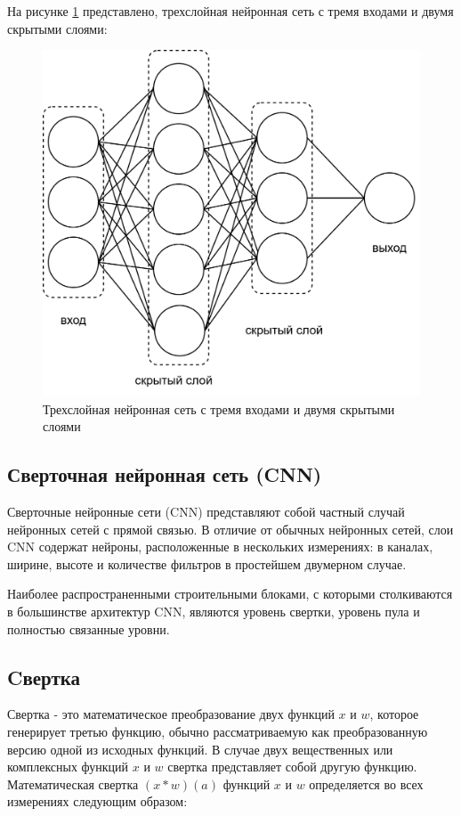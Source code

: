 На рисунке \ref{fig:neuron-arch} представлено, трехслойная нейронная сеть с тремя входами и двумя скрытыми слоями:
\begin{figure}[H]
	\centering
	\includegraphics[width=0.7\linewidth]{assets/neural-arch.png}
	\caption{Трехслойная нейронная сеть с тремя входами и двумя скрытыми слоями}
	\label{fig:neuron-arch}
\end{figure}

\subsection{Сверточная нейронная сеть (CNN)}

Сверточные нейронные сети (CNN) представляют собой частный случай нейронных сетей с прямой связью. В отличие от обычных нейронных сетей, слои CNN содержат нейроны, расположенные в нескольких измерениях: в каналах, ширине, высоте и количестве фильтров в простейшем двумерном случае.

Наиболее распространенными строительными блоками, с которыми столкиваются в большинстве архитектур CNN, являются уровень свертки, уровень пула и полностью связанные уровни.

\subsection*{Cвертка}

Свертка - это математическое преобразование двух функций \(x\) и \(w\), которое генерирует третью функцию, обычно рассматриваемую как преобразованную версию одной из исходных функций. В случае двух вещественных или комплексных функций \(x\) и \(w\) свертка представляет собой другую функцию. Математическая свертка \((x * w)(a)\) функций \(x\) и \(w\) определяется во всех измерениях следующим образом:

